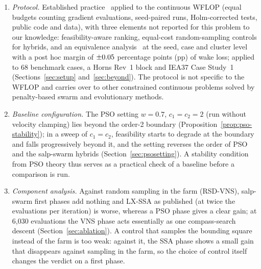 \begin{enumerate}
\item \emph{Protocol.} Established practice~\cite{Derrac2011,BartzBeielstein2020,LaTorre2021} applied to the continuous WFLOP (equal budgets counting gradient evaluations, seed-paired runs, Holm-corrected tests, public code and data), with three elements not reported for this problem to our knowledge: feasibility-aware ranking, equal-cost random-sampling controls for hybrids, and an equivalence analysis~\cite{Lakens2017,Benavoli2017} at the seed, case and cluster level with a post hoc margin of $\pm0.05$ percentage points (pp) of wake loss; applied to 68 benchmark cases, a Horns Rev~1 block and IEA37 Case Study~1 (Sections~\ref{sec:setup} and~\ref{sec:beyond}). The protocol is not specific to the WFLOP and carries over to other constrained continuous problems solved by penalty-based swarm and evolutionary methods.
\item \emph{Baseline configuration.} The PSO setting $w=0.7$, $c_1=c_2=2$ (run without velocity clamping) lies beyond the order-2 boundary (Proposition~\ref{prop:pso-stability}); in a sweep of $c_1=c_2$, feasibility starts to degrade at the boundary and falls progressively beyond it, and the setting reverses the order of PSO and the salp-swarm hybrids (Section~\ref{sec:psosetting}). A stability condition from PSO theory thus serves as a practical check of a baseline before a comparison is run.
\item \emph{Component analysis.} Against random sampling in the farm (RSD-VNS), salp-swarm first phases add nothing and LX-SSA as published (at twice the evaluations per iteration) is worse, whereas a PSO phase gives a clear gain; at 6,030 evaluations the VNS phase acts essentially as one compass-search descent (Section~\ref{sec:ablation}). A control that samples the bounding square instead of the farm is too weak: against it, the SSA phase shows a small gain that disappears against sampling in the farm, so the choice of control itself changes the verdict on a first phase.

\end{enumerate}
